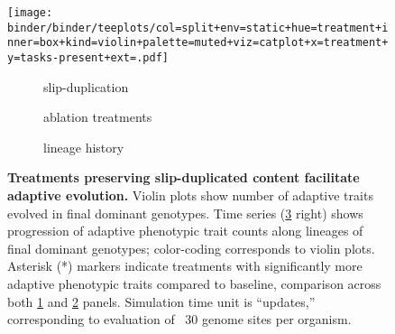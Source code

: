 \begin{figure}[!h]
  \centering
  \begin{adjustbox}{scale=0.8}
    \texttt{[image: binder/binder/teeplots/col=split+env=static+hue=treatment+inner=box+kind=violin+palette=muted+viz=catplot+x=treatment+y=tasks-present+ext=.pdf]}%
    \hspace*{-2.0cm}%
    \raisebox{0.125in}{%
      \texttt{[image: binder/binder/teeplots/env=static+errorbar=ci+hue=treatment+kind=line+palette=muted+viz=relplot+x=time-100k+y=tasks-present+ext=.pdf]}}%
  \end{adjustbox}

  \vspace{-7ex}

  \begin{subfigure}{0.3\textwidth}
    \caption{\small slip-duplication}
    \label{fig:results_panels:slip_duplication}
  \end{subfigure}%
  \begin{subfigure}{0.35\textwidth}
    \caption{\small ablation treatments}
    \label{fig:results_panels:ablation}
  \end{subfigure}%
  \begin{subfigure}{0.22\textwidth}
    \caption{\small lineage history}
    \label{fig:results_panels:time_series}
  \end{subfigure}

  \vspace{1ex}

  \caption{\textbf{Treatments preserving slip-duplicated content facilitate adaptive evolution.}
    \small Violin plots show number of adaptive traits evolved in final dominant genotypes.
    Time series (\ref{fig:results_panels:time_series} right) shows progression of adaptive phenotypic trait counts along lineages of final dominant genotypes; color-coding corresponds to violin plots.
    Asterisk (*) markers indicate treatments with significantly more adaptive phenotypic traits compared to baseline, comparison across both \ref{fig:results_panels:slip_duplication} and \ref{fig:results_panels:ablation} panels.
    Simulation time unit is “updates,” corresponding to evaluation of ~30 genome sites per organism.}
  \label{fig:results_panels}
\end{figure}
